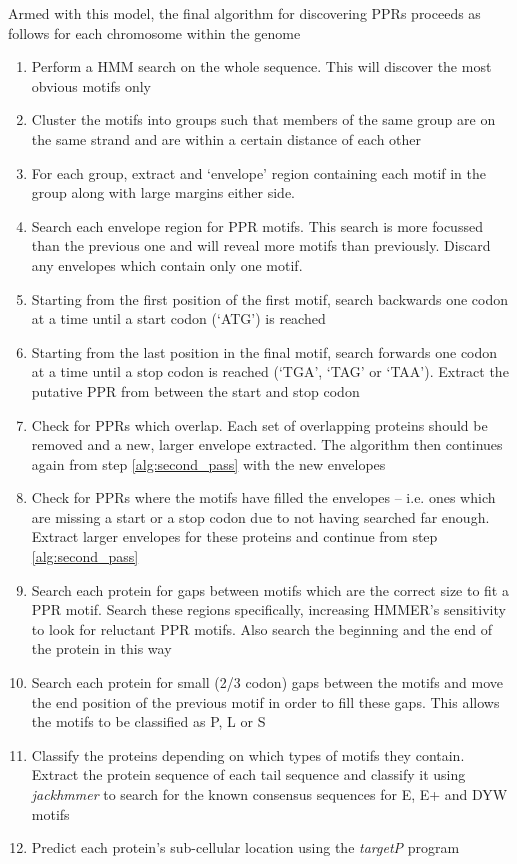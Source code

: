 Armed with this model, the final algorithm for discovering PPRs proceeds as
follows for each chromosome within the genome
\begin{enumerate}
  \item \label{alg:first_pass}
    Perform a HMM search on the whole sequence. This will discover the most
    obvious motifs only
  \item \label{alg:grouping}
    Cluster the motifs into groups such that members of the same group are on
    the same strand and are within a certain distance of each other
  \item \label{alg:envelopes} 
    For each group, extract and `envelope' region containing each motif in the
    group along with large margins either side. 
  \item \label{alg:second_pass}
    Search each envelope region for PPR motifs. This search is more
    focussed than the previous one and will reveal more motifs than previously.
    Discard any envelopes which contain only one motif.
  \item Starting from the first position of the first motif, search backwards
    one codon at a time until a start codon (`ATG') is reached
  \item Starting from the last position in the final motif, search forwards one
    codon at a time until a stop codon is reached (`TGA', `TAG' or `TAA').
    Extract the putative PPR from between the start and stop codon
  \item \label{alg:overlap}
    Check for PPRs which overlap. 
    Each set of overlapping proteins should be removed and a new, larger
    envelope extracted. The algorithm then continues again from step
    \ref{alg:second_pass} with the new envelopes
  \item \label{alg:large_proteins}
    Check for PPRs where the motifs have filled the envelopes -- i.e. ones
    which are missing a start or a stop codon due to not having searched far
    enough. Extract larger envelopes for these proteins and continue from step
    \ref{alg:second_pass}
  \item \label{alg:reluctance}
    Search each protein for gaps between motifs which are the correct size
    to fit a PPR motif. Search these regions specifically, increasing HMMER's
    sensitivity to look for reluctant PPR
    motifs. Also search the beginning and the end of the protein in this way
  \item \label{alg:remove_gaps}
    Search each protein for small (2/3 codon) gaps between the motifs and
    move the end position of the previous motif in order to fill these gaps.
    This allows the motifs to be classified as P, L or S
  \item \label{alg:classification} 
    Classify the proteins depending on which types of motifs they contain.
    Extract the protein sequence of each tail sequence and classify it using
    \emph{jackhmmer} to search for the known consensus sequences for E, E+ and
    DYW motifs
  \item \label{alg:subcellular_location}
    Predict each protein's sub-cellular location using the \emph{targetP}
    program
\end{enumerate}
